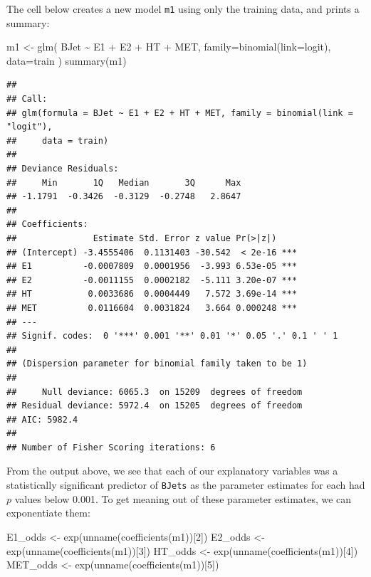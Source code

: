 \documentclass[
]{article}
\newenvironment{Shaded}{\begin{snugshade}}{\end{snugshade}}
\newcommand{\AttributeTok}[1]{\textcolor[rgb]{0.77,0.63,0.00}{#1}}
\newcommand{\DecValTok}[1]{\textcolor[rgb]{0.00,0.00,0.81}{#1}}
\newcommand{\FunctionTok}[1]{\textcolor[rgb]{0.00,0.00,0.00}{#1}}
\newcommand{\NormalTok}[1]{#1}
\newcommand{\OtherTok}[1]{\textcolor[rgb]{0.56,0.35,0.01}{#1}}
\newcommand{\SpecialCharTok}[1]{\textcolor[rgb]{0.00,0.00,0.00}{#1}}
\newcommand{\StringTok}[1]{\textcolor[rgb]{0.31,0.60,0.02}{#1}}
\begin{document}
The cell below creates a new model \texttt{m1} using only the training
data, and prints a summary:

\begin{Shaded}
\begin{Highlighting}[]
\NormalTok{m1 }\OtherTok{\textless{}{-}} \FunctionTok{glm}\NormalTok{(}
\NormalTok{  BJet }\SpecialCharTok{\textasciitilde{}}\NormalTok{ E1 }\SpecialCharTok{+}\NormalTok{ E2 }\SpecialCharTok{+}\NormalTok{ HT }\SpecialCharTok{+}\NormalTok{ MET, }\AttributeTok{family=}\FunctionTok{binomial}\NormalTok{(}\AttributeTok{link=}\StringTok{\textquotesingle{}logit\textquotesingle{}}\NormalTok{), }
  \AttributeTok{data=}\NormalTok{train}
\NormalTok{)}
\FunctionTok{summary}\NormalTok{(m1)}
\end{Highlighting}
\end{Shaded}

\begin{verbatim}
## 
## Call:
## glm(formula = BJet ~ E1 + E2 + HT + MET, family = binomial(link = "logit"), 
##     data = train)
## 
## Deviance Residuals: 
##     Min       1Q   Median       3Q      Max  
## -1.1791  -0.3426  -0.3129  -0.2748   2.8647  
## 
## Coefficients:
##               Estimate Std. Error z value Pr(>|z|)    
## (Intercept) -3.4555406  0.1131403 -30.542  < 2e-16 ***
## E1          -0.0007809  0.0001956  -3.993 6.53e-05 ***
## E2          -0.0011155  0.0002182  -5.111 3.20e-07 ***
## HT           0.0033686  0.0004449   7.572 3.69e-14 ***
## MET          0.0116604  0.0031824   3.664 0.000248 ***
## ---
## Signif. codes:  0 '***' 0.001 '**' 0.01 '*' 0.05 '.' 0.1 ' ' 1
## 
## (Dispersion parameter for binomial family taken to be 1)
## 
##     Null deviance: 6065.3  on 15209  degrees of freedom
## Residual deviance: 5972.4  on 15205  degrees of freedom
## AIC: 5982.4
## 
## Number of Fisher Scoring iterations: 6
\end{verbatim}

From the output above, we see that each of our explanatory variables was
a statistically significant predictor of \texttt{BJets} as the parameter
estimates for each had \(p\) values below 0.001. To get meaning out of
these parameter estimates, we can exponentiate them:

\begin{Shaded}
\begin{Highlighting}[]
\NormalTok{E1\_odds }\OtherTok{\textless{}{-}} \FunctionTok{exp}\NormalTok{(}\FunctionTok{unname}\NormalTok{(}\FunctionTok{coefficients}\NormalTok{(m1))[}\DecValTok{2}\NormalTok{])}
\NormalTok{E2\_odds }\OtherTok{\textless{}{-}} \FunctionTok{exp}\NormalTok{(}\FunctionTok{unname}\NormalTok{(}\FunctionTok{coefficients}\NormalTok{(m1))[}\DecValTok{3}\NormalTok{])}
\NormalTok{HT\_odds }\OtherTok{\textless{}{-}} \FunctionTok{exp}\NormalTok{(}\FunctionTok{unname}\NormalTok{(}\FunctionTok{coefficients}\NormalTok{(m1))[}\DecValTok{4}\NormalTok{])}
\NormalTok{MET\_odds }\OtherTok{\textless{}{-}} \FunctionTok{exp}\NormalTok{(}\FunctionTok{unname}\NormalTok{(}\FunctionTok{coefficients}\NormalTok{(m1))[}\DecValTok{5}\NormalTok{])}
\end{Highlighting}
\end{Shaded}
\end{document}
